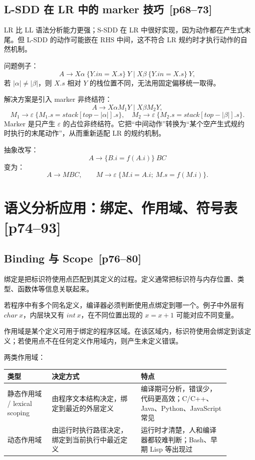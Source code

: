 \documentclass[UTF8,fontset=none,11pt]{ctexart}
\newenvironment{defbox}[1][]{%
  \par\medskip\noindent{\color{defrule}\rule{\linewidth}{1.1pt}}\par\nopagebreak
  \noindent{\bfseries\color{defrule}#1}\par\nopagebreak\smallskip}%
  {\par\nopagebreak\smallskip\noindent{\color{defrule}\rule{\linewidth}{0.4pt}}\par\medskip}
\newcommand{\pg}[1]{\texorpdfstring{{\small\color{graytext}\,[p#1]}}{ [p#1]}}
\newcommand{\eps}{\varepsilon}
\begin{document}
\subsection{L-SDD 在 LR 中的 marker 技巧 \pg{68--73}}

LR 比 LL 语法分析能力更强；S-SDD 在 LR 中很好实现，因为动作都在产生式末尾。但 L-SDD 的动作可能嵌在 RHS 中间，这不符合 LR 规约时才执行动作的自然机制。

问题例子：
\[
A\to X\alpha\ \{Y.in=X.s\}\ Y\mid X\beta\ \{Y.in=X.s\}\ Y,
\]
若 \(|\alpha|\ne|\beta|\)，则 \(X.s\) 相对 \(Y\) 的栈位置不同，无法用固定偏移统一取得。

解决方案是引入 marker 非终结符：
\[
A\to X\alpha M_1Y\mid X\beta M_2Y,
\]
\[
M_1\to\eps\ \{M_1.s=stack[top-|\alpha|].s\},\quad
M_2\to\eps\ \{M_2.s=stack[top-|\beta|].s\}.
\]
Marker 是只产生 \(\eps\) 的占位非终结符。它把“中间动作”转换为“某个空产生式规约时执行的末尾动作”，从而重新适配 LR 的规约机制。

抽象改写：
\[
A\to \{B.i=f(A.i)\}\ BC
\]
变为：
\[
A\to MBC,\qquad M\to\eps\ \{M.i=A.i;\ M.s=f(M.i)\}.
\]

\section{语义分析应用：绑定、作用域、符号表 \pg{74--93}}

\subsection{Binding 与 Scope \pg{76--80}}

\begin{defbox}[Binding]
绑定是把标识符使用点匹配到其定义的过程。定义通常把标识符与内存位置、类型、函数体等信息关联起来。
\end{defbox}

若程序中有多个同名定义，编译器必须判断使用点绑定到哪一个。例子中外层有 \(char\ x\)，内层块又有 \(int\ x\)，在不同位置出现的 \(x=x+1\) 可能对应不同变量。

\begin{defbox}[Scope]
作用域是某个定义可用于绑定的程序区域。在该区域内，标识符使用会绑定到该定义；若使用点不在任何定义作用域内，则产生未定义错误。
\end{defbox}

两类作用域：

\begin{longtable}{L{0.18\linewidth}L{0.36\linewidth}L{0.36\linewidth}}
\toprule
类型 & 决定方式 & 特点 \\
\midrule
静态作用域 / lexical scoping & 由程序文本结构决定，绑定到最近的外层定义 & 编译期可分析，错误少，代码更高效；C/C++、Java、Python、JavaScript 常见 \\
动态作用域 & 由运行时执行路径决定，绑定到当前执行中最近定义 & 运行时才清楚，人和编译器都较难判断；Bash、早期 Lisp 等出现过 \\
\bottomrule
\end{longtable}
\end{document}
